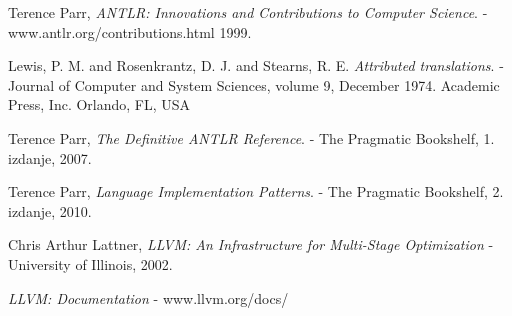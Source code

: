 \begin{thebibliography}{9}

   
	Terence Parr,
	\emph{ANTLR: Innovations and Contributions to Computer Science}.
	- www.antlr.org/contributions.html
	1999.

	Lewis, P. M. and Rosenkrantz, D. J. and Stearns, R. E.
	\emph{Attributed translations}.
	- Journal of Computer and System Sciences, 
	volume 9,
	December 1974.
	Academic Press, Inc. Orlando, FL, USA

	Terence Parr,
	\emph{The Definitive ANTLR Reference}.
	- The Pragmatic Bookshelf,
	1. izdanje,
	2007.

	Terence Parr,
	\emph{Language Implementation Patterns}.
	- The Pragmatic Bookshelf,
	2. izdanje,
	2010.

	Chris Arthur Lattner,
	\emph{LLVM: An Infrastructure for Multi-Stage Optimization}
	- University of Illinois, 2002.
	
	\emph{LLVM: Documentation}
	- www.llvm.org/docs/
	

\end{thebibliography}